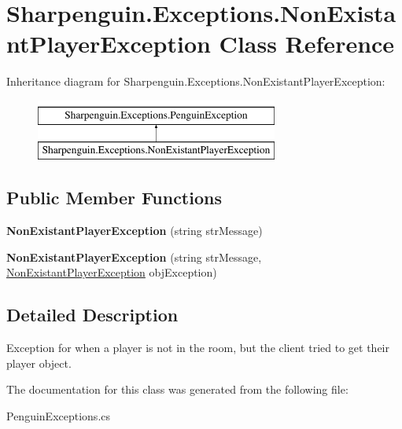 \hypertarget{classSharpenguin_1_1Exceptions_1_1NonExistantPlayerException}{\section{\-Sharpenguin.\-Exceptions.\-Non\-Existant\-Player\-Exception \-Class \-Reference}
\label{classSharpenguin_1_1Exceptions_1_1NonExistantPlayerException}
}
\-Inheritance diagram for \-Sharpenguin.\-Exceptions.\-Non\-Existant\-Player\-Exception\-:\begin{figure}[H]
\begin{center}
\leavevmode
\includegraphics[height=2.000000cm]{classSharpenguin_1_1Exceptions_1_1NonExistantPlayerException}
\end{center}
\end{figure}
\subsection*{\-Public \-Member \-Functions}
\begin{DoxyCompactItemize}
\item 
\hypertarget{classSharpenguin_1_1Exceptions_1_1NonExistantPlayerException_a90511b21814b1bc2db9d2fdb1fe9aca5}{{\bfseries \-Non\-Existant\-Player\-Exception} (string str\-Message)}\label{classSharpenguin_1_1Exceptions_1_1NonExistantPlayerException_a90511b21814b1bc2db9d2fdb1fe9aca5}

\item 
\hypertarget{classSharpenguin_1_1Exceptions_1_1NonExistantPlayerException_a4e058a758643f7834239e6a76225afec}{{\bfseries \-Non\-Existant\-Player\-Exception} (string str\-Message, \hyperlink{classSharpenguin_1_1Exceptions_1_1NonExistantPlayerException}{\-Non\-Existant\-Player\-Exception} obj\-Exception)}\label{classSharpenguin_1_1Exceptions_1_1NonExistantPlayerException_a4e058a758643f7834239e6a76225afec}

\end{DoxyCompactItemize}


\subsection{\-Detailed \-Description}
\-Exception for when a player is not in the room, but the client tried to get their player object. 

\-The documentation for this class was generated from the following file\-:\begin{DoxyCompactItemize}
\item 
\-Penguin\-Exceptions.\-cs\end{DoxyCompactItemize}
